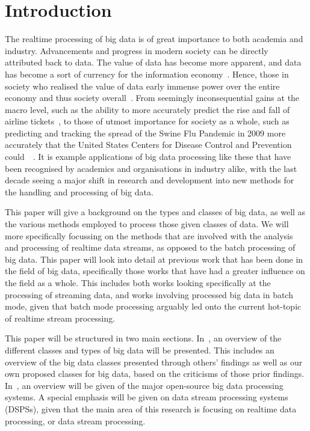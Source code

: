 \documentclass[a4paper,11pt]{article}
\begin{document}
\section{Introduction} %
\label{sec:introduction}

The realtime processing of big data is of great importance to both academia and industry. Advancements and progress in
modern society can be directly attributed back to data. The value of data has become more apparent, and data has become
a sort of currency for the information economy~\cite{st2009examining}. Hence, those in society who realised the value of
data early immense power over the entire economy and thus society overall~\cite{lievesley1993increasing}.
From seemingly inconsequential gains at the macro level, such as the ability to more
accurately predict the rise and fall of airline tickets~\cite{darlin2006airfares}, to those of utmost importance for
society as a whole, such as predicting and tracking the spread of the Swine Flu Pandemic in 2009 more accurately that
the United States Centers for Disease Control and Prevention could~\cite{ritterman2009using}~\cite{mayer2013big}. It is
example applications of big data processing like these that have been recognised by academics and organisations in
industry alike, with the last decade seeing a major shift in research and development into new methods for the handling
and processing of big data.

This paper will give a background on the types and classes of big data, as well as the various methods employed to
process those given classes of data. We will more specifically focussing on the methods that are involved with the
analysis and processing of realtime data streams, as opposed to the batch processing of big data. This paper will look
into detail at previous work that has been done in the field of big data, specifically those works that have had a
greater influence on the field  as a whole. This includes both works looking specifically at the processing of streaming
data, and works involving processed big data in batch mode, given that batch mode processing arguably led onto the
current hot-topic of realtime stream processing.

This paper will be structured in two main sections. In~, an overview of the different
classes and types of big data will be presented. This includes an overview of the big data classes presented through others' findings
as well as our own proposed classes for big data, based on the criticisms of those prior findings. In~,
an overview will be given of the major open-source big data processing systems. A special emphasis will be given on data stream processing
systems (DSPSs), given that the main area of this research is focusing on realtime data processing, or data stream processing.
\end{document}
